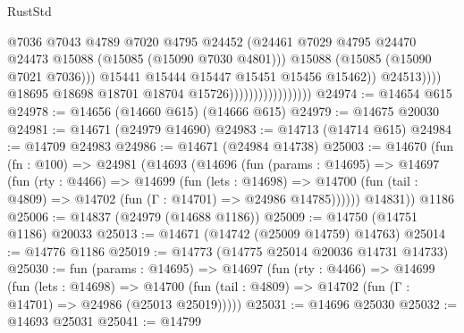 \begin{lexlean}{RustStd}
\begin{coremodule}
                                                    @7036
                                                    @7043
                                                    @4789
                                                    @7020
                                                    @4795
                                                    @24452
                                                    (@24461
                                                      @7029
                                                      @4795
                                                      @24470
                                                      @24473
                                                      @15088
                                                      (@15085 (@15090 @7030 @4801)))
                                                    @15088
                                                    (@15085 (@15090 @7021 @7036)))
                                                  @15441
                                                  @15444
                                                  @15447
                                                  @15451
                                                  @15456
                                                  @15462))
                                              @24513))))
                                      @18695
                                      @18698
                                      @18701
                                      @18704
                                      @15726)))))))))))))))))
@24974 := @14654 @615
@24978 := @14656 (@14660 @615) (@14666 @615)
@24979 := @14675 @20030
@24981 := @14671 (@24979 @14690)
@24983 := @14713 (@14714 @615)
@24984 := @14709 @24983
@24986 := @14671 (@24984 @14738)
@25003 := @14670
    (fun (fn : @100) =>
    @24981
      (@14693
        (@14696
          (fun (params : @14695) =>
          @14697
            (fun (rty : @4466) =>
            @14699
              (fun (lets : @14698) =>
              @14700 (fun (tail : @4809) => @14702 (fun (Γ : @14701) => @24986 @14785))))))
        @14831))
    @1186
@25006 := @14837 (@24979 (@14688 @1186))
@25009 := @14750 (@14751 @1186) @20033
@25013 := @14671 (@14742 (@25009 @14759) @14763)
@25014 := @14776 @1186
@25019 := @14773 (@14775 @25014 @20036 @14731 @14733)
@25030 := fun (params : @14695) =>
  @14697
    (fun (rty : @4466) =>
    @14699
      (fun (lets : @14698) =>
      @14700 (fun (tail : @4809) => @14702 (fun (Γ : @14701) => @24986 (@25013 @25019)))))
@25031 := @14696 @25030
@25032 := @14693 @25031
@25041 := @14799

\end{coremodule}
\end{lexlean}
